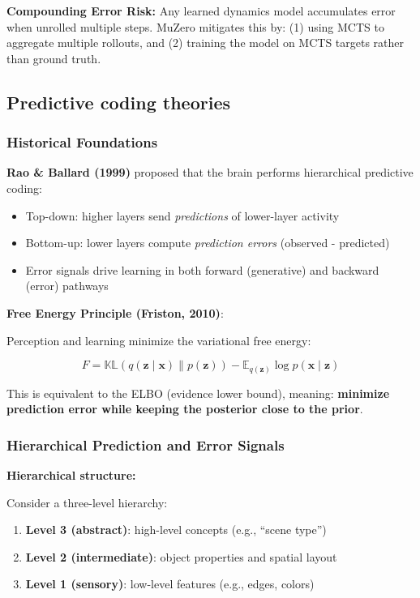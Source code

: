 \begin{warnbox}
    \textbf{Compounding Error Risk:} Any learned dynamics model accumulates error when unrolled multiple steps. MuZero mitigates this by: (1) using MCTS to aggregate multiple rollouts, and (2) training the model on MCTS targets rather than ground truth.
\end{warnbox}

\subsection{Predictive coding theories}

\subsubsection{Historical Foundations}

\textbf{Rao \& Ballard (1999)} proposed that the brain performs hierarchical predictive coding:
\begin{itemize}
    \item Top-down: higher layers send \textit{predictions} of lower-layer activity
    \item Bottom-up: lower layers compute \textit{prediction errors} (observed - predicted)
    \item Error signals drive learning in both forward (generative) and backward (error) pathways
\end{itemize}

\textbf{Free Energy Principle (Friston, 2010)}:

Perception and learning minimize the variational free energy:

\[
F = \mathbb{KL}(q(\mathbf{z} \mid \mathbf{x}) \| p(\mathbf{z})) - \mathbb{E}_{q(\mathbf{z})} \log p(\mathbf{x} \mid \mathbf{z})
\]

This is equivalent to the ELBO (evidence lower bound), meaning: \textbf{minimize prediction error while keeping the posterior close to the prior}.

\subsubsection{Hierarchical Prediction and Error Signals}

\textbf{Hierarchical structure:}

Consider a three-level hierarchy:

\begin{enumerate}
    \item \textbf{Level 3 (abstract)}: high-level concepts (e.g., ``scene type'')
    \item \textbf{Level 2 (intermediate)}: object properties and spatial layout
    \item \textbf{Level 1 (sensory)}: low-level features (e.g., edges, colors)
\end{enumerate}

